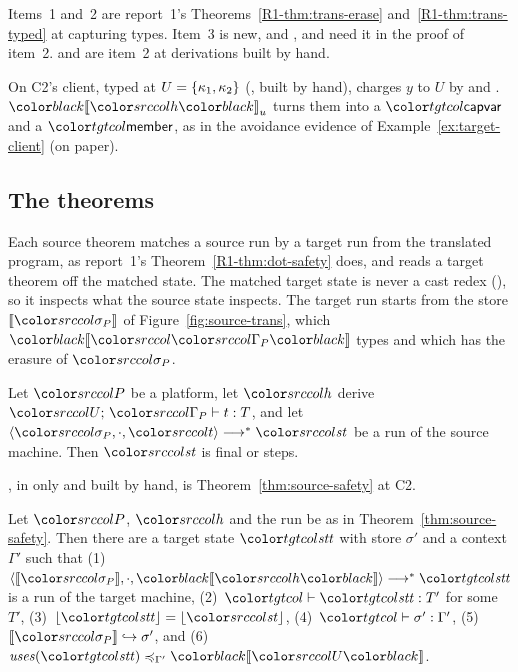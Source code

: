 Items~1 and~2 are report~1's Theorems~\ref{R1-thm:trans-erase} and~\ref{R1-thm:trans-typed} at capturing types. Item~3 is new, and ,  and  need it in the proof of item~2.  and  are item~2 at derivations built by hand.

On C2's client, typed at $U = \{\kappa_1,\kappa_2\}$ (, built by hand),  charges $y$ to $U$ by  and . $\transu{h}$ turns them into a $\ev{capvar}$ and a $\ev{member}$, as in the avoidance evidence of Example~\ref{ex:target-client} (on paper).

\subsection{The theorems}\label{sec:source-thms}

Each source theorem matches a source run by a target run from the translated program, as report~1's Theorem~\ref{R1-thm:dot-safety} does, and reads a target theorem off the matched state. The matched target state is never a cast redex (), so it inspects what the source state inspects. The target run starts from the store $\tplatstore$ of Figure~\ref{fig:source-trans}, which $\trans{\platctx}$ types and which has the erasure of $\platstore$.

\begin{theorem}\label{thm:source-safety}
Let $\plat$ be a platform, let $\src{h}$ derive $\dtyuj{U}{\platctx}{t}{T}$, and let $\mst{\platstore}{\cdot}{\src{t}} \steps \src{\mathit{st}}$ be a run of the source machine. Then $\src{\mathit{st}}$ is final or steps.
\end{theorem}

, in \treeK only and built by hand, is Theorem~\ref{thm:source-safety} at C2.

\begin{theorem}\label{thm:source-pred}
Let $\plat$, $\src{h}$ and the run be as in Theorem~\ref{thm:source-safety}. Then there are a target state $\tstate$ with store $\sigma'$ and a context $\Gamma'$ such that (1)~$\mst{\tplatstore}{\cdot}{\trans{h}} \steps \tstate$ is a run of the target machine, (2)~$\statej{\tstate}{T'}$ for some $T'$, (3)~$\erase{\tstate} = \erase{\src{\mathit{st}}}$, (4)~$\storej{\sigma'}{\Gamma'}$, (5)~$\sext{\tplatstore}{\sigma'}$, and (6)~$\caple{\Gamma'}{\uses{\tstate}}{\trans{U}}$.
\end{theorem}

